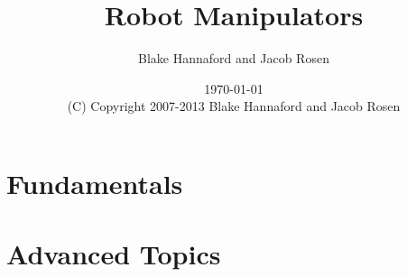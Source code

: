 \documentclass[oneside]{book}
\begin{document}
\setpagewiselinenumbers
\modulolinenumbers[5]

\setcounter{chapter}{0}


 \title{Robot Manipulators}

 \author{Blake Hannaford and Jacob Rosen}

 \date{\today\\(C) Copyright 2007-2013 Blake Hannaford and Jacob Rosen}

 \maketitle

\tableofcontents

\mainmatter

%
%
%
%

 \part{Fundamentals}

%
%
  \part{Advanced Topics}

 \appendix



%
\label{LastPage}
\end{document}
